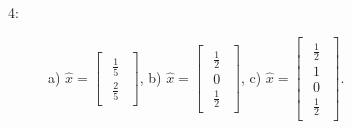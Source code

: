 \documentclass{article}
\begin{document}
\begin{description}
    \item [4:]
        a) $\hat{x} = \begin{bmatrix}\begin{array}{r} \frac{1}{5} \\ \frac{2}{5} \end{array}\end{bmatrix}$,
        b) $\hat{x} = \begin{bmatrix}\begin{array}{r} \frac{1}{2} \\ 0\\ \frac{1}{2} \end{array}\end{bmatrix}$,
        c) $\hat{x} = \begin{bmatrix}\begin{array}{r} \frac{1}{2} \\ 1\\ 0 \\ \frac{1}{2} \end{array}\end{bmatrix}$.
    
\end{description}
\end{document}

